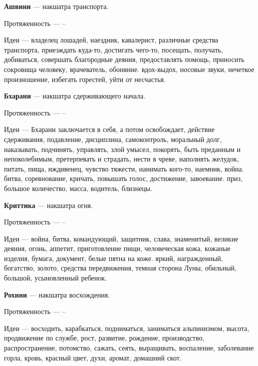 \begin{myenum}
	\item \textbf{Ашвини} --- накшатра транспорта. 
		\begin{mydescr}
			\item[Протяженность] ---  -- 
			\item[Идеи] --- владелец лошадей, наездник, кавалерист, различные средства транспорта, приезждать куда-то, достигать чего-то, посещать, получать, добиваться, совершать благородные деяния, предоставлять помощь, приносить сокровища человеку, врачеватель, обоняние. вдох-выдох, носовые звуки, нечеткое произношение, избегать горестей, уйти от несчастья.
		\end{mydescr}
	\item \textbf{Бхарани} --- накшатра сдерживающего начала.
		\begin{mydescr}
			\item[Протяженность] ---  -- \signum{26}{40}{\aries}
			\item[Идеи] --- Бхарани заключается в себя, а потом освобождает, действие сдерживания, подавление, дисциплина, самоконтроль, моральный долг, наказывать, подчинять, управлять, злой умысел, покорять, быть преданным и непоколебимым, претерпевать и страдать, нести в чреве, наполнять желудок, питать, пища, иждивенец, чувство тяжести, нанимать кого-то, наемник, война. битва, соревнование, кричать, повышать голос, достижение, завоевание. приз, большое количество, масса, водитель, близнецы.
		\end{mydescr}
	\item \textbf{Криттика} --- накшатра огня.
		\begin{mydescr}
			\item[Протяженность] ---  -- \signum{10}{}{\taurus}
			\item[Идеи] --- война, битва, командующий, защитник, слава, знаменитый, великие деяния, огонь, аппетит, приготовление пищи, человеческая кожа, кожаные изделия, бумага, документ, белые пятна на коже. яркий, награжденный, богатство, золото, средства передвижения, темная сторона Луны, обильный, большой, усыновленный ребенок.
		\end{mydescr}
	\item \textbf{Рохини} --- накшатра восхождения.
		\begin{mydescr}
			\item[Протяженность] ---  -- \signum{23}{20}{\taurus}
			\item[Идеи] --- восходить, карабкаться, подниматься, заниматься альпинизмом, высота, продвижение по службе, рост, развитие, рождение, производство, распространение, потомство, сажать, сеять, выращивать, воспаление, заболевание горла, кровь, красный цвет, духи, аромат, домашний скот.

\end{mydescr}
\end{myenum}
